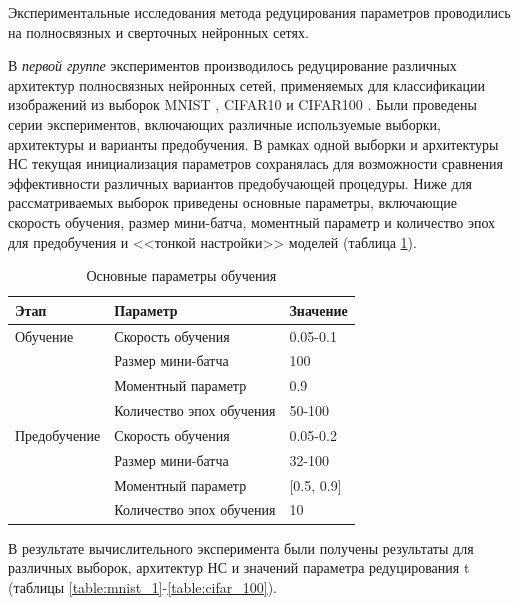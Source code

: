 Экспериментальные исследования метода редуцирования параметров проводились на полносвязных и сверточных нейронных сетях.

В \textit{первой группе} экспериментов производилось редуцирование различных архитектур полносвязных нейронных сетей, применяемых для классификации изображений из выборок MNIST \cite{mnist}, CIFAR10 и CIFAR100 \cite[c.~3]{krizhevsky2009learning}.
Были проведены серии экспериментов, включающих различные используемые выборки, архитектуры и варианты предобучения. В рамках одной выборки и архитектуры НС текущая инициализация параметров сохранялась для возможности сравнения эффективности различных вариантов предобучающей процедуры.
Ниже для рассматриваемых выборок приведены основные параметры, включающие скорость обучения, размер мини-батча, моментный параметр и количество эпох для предобучения и <<тонкой настройки>> моделей (таблица \ref{table:reduce_training_params}).

\begin{table} [!h]
  \small
  \caption{Основные параметры обучения}\label{table:reduce_training_params}
\centering
\begin{tabular}{| p{3cm} | p{6cm} | p{2cm} |}
  \hline
    \textbf{Этап} & \textbf{Параметр} & \textbf{Значение}\\
    \hline
    Обучение & Скорость обучения & 0.05-0.1\\
    \cline{2-3}
    & Размер мини-батча & 100 \\
    \cline{2-3}
    & Моментный параметр & 0.9 \\
    \cline{2-3}
    & Количество эпох обучения & 50-100\\
    \hline
    Предобучение & Скорость обучения & 0.05-0.2\\
    \cline{2-3}
    & Размер мини-батча & 32-100 \\
    \cline{2-3}
    & Моментный параметр & [0.5, 0.9] \\
    \cline{2-3}
    & Количество эпох обучения & 10\\
    \hline
\end{tabular}
\end{table}

В результате вычислительного эксперимента были получены результаты для различных выборок, архитектур НС и значений параметра редуцирования t (таблицы \ref{table:mnist_1}-\ref{table:cifar_100}).

